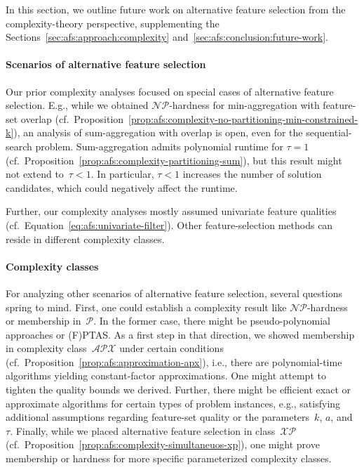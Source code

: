\documentclass{article}
\theoremstyle{definition}
\begin{document}
In this section, we outline future work on alternative feature selection from the complexity-theory perspective, supplementing the Sections~\ref{sec:afs:approach:complexity} and~\ref{sec:afs:conclusion:future-work}.

\paragraph{Scenarios of alternative feature selection}

Our prior complexity analyses focused on special cases of alternative feature selection.
E.g., while we obtained $\mathcal{NP}$-hardness for min-aggregation with feature-set overlap (cf.~Proposition~\ref{prop:afs:complexity-no-partitioning-min-constrained-k}), an analysis of sum-aggregation with overlap is open, even for the sequential-search problem.
Sum-aggregation admits polynomial runtime for $\tau=1$ (cf.~Proposition~\ref{prop:afs:complexity-partitioning-sum}), but this result might not extend to~$\tau < 1$.
In particular, $\tau < 1$ increases the number of solution candidates, which could negatively affect the runtime.

Further, our complexity analyses mostly assumed univariate feature qualities (cf.~Equation~\ref{eq:afs:univariate-filter}).
Other feature-selection methods can reside in different complexity classes.

\paragraph{Complexity classes}

For analyzing other scenarios of alternative feature selection, several questions spring to mind.
First, one could establish a complexity result like $\mathcal{NP}$-hardness or membership in~$\mathcal{P}$.
In the former case, there might be pseudo-polynomial approaches or (F)PTAS.
As a first step in that direction, we showed membership in complexity class~$\mathcal{APX}$ under certain conditions (cf.~Proposition~\ref{prop:afs:approximation-apx}), i.e., there are polynomial-time algorithms yielding constant-factor approximations.
One might attempt to tighten the quality bounds we derived.
Further, there might be efficient exact or approximate algorithms for certain types of problem instances, e.g., satisfying additional assumptions regarding feature-set quality or the parameters~$k$, $a$, and $\tau$.
Finally, while we placed alternative feature selection in class~$\mathcal{XP}$ (cf.~Proposition~\ref{prop:afs:complexity-simultaneuos-xp}), one might prove membership or hardness for more specific parameterized complexity classes.
\end{document}
